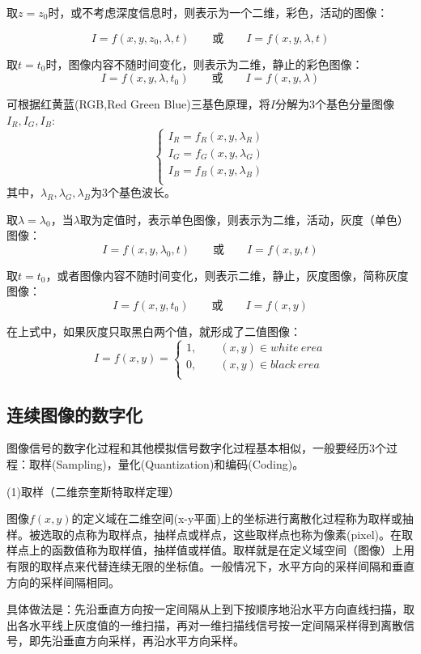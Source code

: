 \documentclass[11pt]{article}
\begin{document}
取$z=z_0$时，或不考虑深度信息时，则表示为一个二维，彩色，活动的图像：

$$I = f(x,y,z_0,\lambda,t)\qquad \text{或} \qquad I = f(x,y,\lambda,t)$$

取$t=t_0$时，图像内容不随时间变化，则表示为二维，静止的彩色图像：
$$I = f(x,y,\lambda,t_0) \qquad \text{或} \qquad I = f(x,y,\lambda)$$

可根据红黄蓝(RGB,Red Green Blue)三基色原理，将$I$分解为3个基色分量图像$I_R,I_G,I_B$:
$$
\left\{\begin{matrix}
	I_R = f_R(x,y,\lambda_R) \\ 
	I_G = f_G(x,y,\lambda_G) \\
	I_B = f_B(x,y,\lambda_B) \\
\end{matrix}\right.
$$
其中，$\lambda_R,\lambda_G,\lambda_B$为3个基色波长。

取$\lambda = \lambda_0$，当$\lambda$取为定值时，表示单色图像，则表示为二维，活动，灰度（单色）图像：
$$I = f(x,y,\lambda_0,t)\qquad \text{或} \qquad I = f(x,y,t)$$

取$t=t_0$，或者图像内容不随时间变化，则表示二维，静止，灰度图像，简称灰度图像：
$$I = f(x,y,t_0)\qquad \text{或} \qquad I = f(x,y)$$

在上式中，如果灰度只取黑白两个值，就形成了二值图像：
$$I = f(x,y) = \left\{\begin{matrix}
	1, \qquad (x,y)\in white\ erea \\ 
	0, \qquad (x,y)\in black\ erea \\
\end{matrix}\right.$$
\subsection{连续图像的数字化}
图像信号的数字化过程和其他模拟信号数字化过程基本相似，一般要经历3个过程：取样(Sampling)，量化(Quantization)和编码(Coding)。

(1)取样（二维奈奎斯特取样定理）

图像$f(x,y)$的定义域在二维空间(x-y平面)上的坐标进行离散化过程称为取样或抽样。被选取的点称为取样点，抽样点或样点，这些取样点也称为像素(pixel)。在取样点上的函数值称为取样值，抽样值或样值。取样就是在定义域空间（图像）上用有限的取样点来代替连续无限的坐标值。一般情况下，水平方向的采样间隔和垂直方向的采样间隔相同。

具体做法是：先沿垂直方向按一定间隔从上到下按顺序地沿水平方向直线扫描，取出各水平线上灰度值的一维扫描，再对一维扫描线信号按一定间隔采样得到离散信号，即先沿垂直方向采样，再沿水平方向采样。
\end{document}
